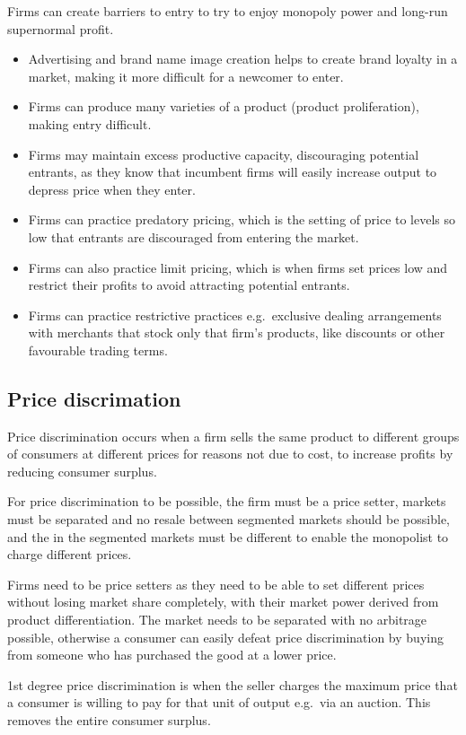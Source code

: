 \documentclass[Economics.tex]{subfiles}
\begin{document}
Firms can create barriers to entry to try to enjoy monopoly power and long-run supernormal profit.
\begin{itemize}
\item Advertising and brand name image creation helps to create brand loyalty in a market, making it more difficult for a newcomer to enter.
\item Firms can produce many varieties of a product (product proliferation), making entry difficult.
\item Firms may maintain excess productive capacity, discouraging potential entrants, as they know that incumbent firms will easily increase output to depress price when they enter.
\item Firms can practice predatory pricing, which is the setting of price to levels so low that entrants are discouraged from entering the market.
\item Firms can also practice limit pricing, which is when firms set prices low and restrict their profits to avoid attracting potential entrants.
\item Firms can practice restrictive practices e.g.\ exclusive dealing arrangements with merchants that stock only that firm's products, like discounts or other favourable trading terms.
\end{itemize}
\subsection{Price discrimation}
Price discrimination occurs when a firm sells the same product to different groups of consumers at different prices for reasons not due to cost, to increase profits by reducing consumer surplus.

For price discrimination to be possible, the firm must be a price setter, markets must be separated and no resale between segmented markets should be possible, and the \PE[D] in the segmented markets must be different to enable the monopolist to charge different prices.

Firms need to be price setters as they need to be able to set different prices without losing market share completely, with their market power derived from product differentiation. The market needs to be separated with no arbitrage possible, otherwise a consumer can easily defeat price discrimination by buying from someone who has purchased the good at a lower price.

1st degree price discrimination is when the seller charges the maximum price that a consumer is willing to pay for that unit of output e.g.\ via an auction. This removes the entire consumer surplus.
\end{document}

